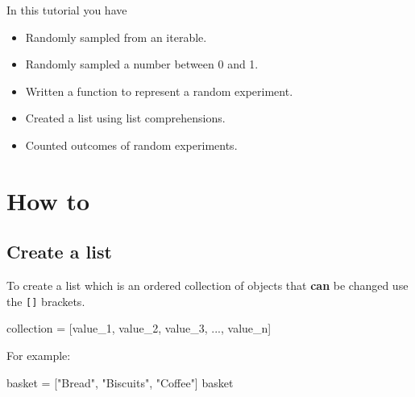 \begin{note}
In this tutorial you have
\begin{itemize}
\item 

Randomly sampled from an iterable.

\item 

Randomly sampled a number between 0 and 1.

\item 

Written a function to represent a random experiment.

\item 

Created a list using list comprehensions.

\item 

Counted outcomes of random experiments.

\end{itemize}
\end{note}





\section{How to}
\label{\detokenize{tools-for-mathematics/06-probability/how/main:how-to}}\label{\detokenize{tools-for-mathematics/06-probability/how/main::doc}}

\subsection{Create a list}
\label{sec:create_a_list}

To create a list which is an ordered collection of objects that \textbf{can} be
changed use the \texttt{{[}{]}} brackets.


\begin{api}
collection = [value_1, value_2, value_3, ..., value_n]
\end{api}



For example:




\begin{pyin}
basket = ["Bread", "Biscuits", "Coffee"]
basket
\end{pyin}





